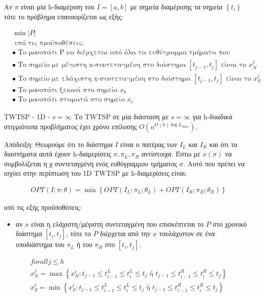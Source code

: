 \documentclass[oneside,12pt]{book}
\theoremstyle{definition}
\begin{document}
Αν \(π\) είναι μία h-διαμέριση του \(I = [a,b]\) με σημεία διαμέρισης τα σημεία \(\left\{ t_i \right\}\) τότε το πρόβλημα επαναορίζεται ως εξής:

\begin{align*}
	&\min |P| \\
	&\text{ υπό τις προϋποθέσεις:} \\
	&\bullet \text{ Το μονοπάτι P να διέρχεται από όλα τα ευθύγραμμα τμήματα που βρίσκονται εντός του I} \\
	&\bullet \text{ Το σημείο με μέγιστη x-συντεταγμένη στο διάστημα } [t_{j-1}, t_j] \text{ είναι το } x^{j}_N  \\
	&\bullet \text{ Το σημείο με ελάχιστη x-συντεταγμένη στο διάστημα } [t_{j-1}, t_j] \text{ είναι το } x^{j}_S  \\
	&\bullet \text{ Το μονοπάτι ξεκινά στο σημείο } x_b \\
	&\bullet \text{ Το μονοπάτι σταματά στο σημείο } x_e
\end{align*}

\begin{mytheorem}{TWTSP - 1D - \(s = \infty\)}{}
	Το TWTSP σε μία διάσταση με \(s = \infty\) για h-δυαδικά στιγμιότυπα προβλήματος έχει χρόνο επίλυσης \(O(n^{O(h) \log L_{max}})\).
\end{mytheorem}

Απόδειξη:
Θεωρούμε ότι το διάστημα \(I\) είναι ο πατέρας των \(I_L\) και \(I_R\) και ότι τα διαστήματα αυτά έχουν h-διαμερίσεις \(π, π_L, π_R\) αντίστοιχα. Έστω με \(x(σ)\) να συμβολίζεται η χ συντεταγμένη ενός ευθύγραμμου τμήματος \(σ\). Αυτό που πρέπει να ισχύει στην περίπτωση του 1D TWTSP με h-διαμερίσεις είναι:

\begin{align*}
	OPT(I;π;θ) = \min \left\{ OPT(I_L;π_L;θ_L) + OPT(I_R;π_R;θ_R) \right\}
\end{align*}

υπό τις εξής προϋποθέσεις: \\
\begin{itemize}
	\item αν \(x\) είναι η ελάχιστη/μέγιστη συντεταγμένη που επισκέπτεται το \(P\) στο χρονικό διάστημα \([t_i, t_j]\), τότε το \(P\) διέρχεται από την \(x\) τουλάχιστον σε ένα υποδιάστημα του \(π_L\) ή του \(π_R\) στο \([t_i, t_j]\). 
\end{itemize}

\begin{align*}
	forall j \leq h \\
	x^{j}_N = \max \left\{ x^{i}_N: t_{j-1} \leq t_{i-1}^L \leq t_{i}^L \leq t_j \text{ ή } t_{j-1} \leq t_{i-1}^R \leq t_{i}^R \leq t_j \right\} \\
	x^{j}_S = \min \left\{ x^{i}_S: t_{j-1} \leq t_{i-1}^L \leq t_{i}^L \leq t_j \text{ ή } t_{j-1} \leq t_{i-1}^R \leq t_{i}^R \leq t_j \right\}
\end{align*}
\end{document}
